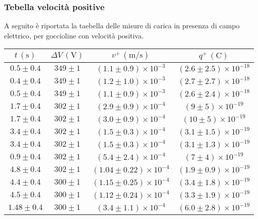 \subsubsection{Tebella velocità positive}
A seguito è riportata la taebella delle misure di carica in presenza di campo elettrico, per goccioline con velocità positiva.        \renewcommand{\arraystretch}{1.3} %
        \begin{longtable}[C]{|c|c|c|c|}
            \hline
            $t \, (\mathrm{s})$ & $\Delta V \, (\mathrm{V})$ & $v^+ \, (\mathrm{m/s})$ & $q^+ \, (\mathrm{C})$ \\
            \hline
            $0.5 \pm 0.4$ & $349 \pm 1$ & $(1.1 \pm 0.9) \times 10^{-3}$ & $(2.6 \pm 2.5) \times 10^{-18}$ \\
            \hline
            $0.4 \pm 0.4$ & $349 \pm 1$ & $(1.2 \pm 1.0) \times 10^{-3}$ & $(2.7 \pm 2.7) \times 10^{-18}$ \\
            \hline
            $0.5 \pm 0.4$ & $349 \pm 1$ & $(1.1 \pm 0.9) \times 10^{-3}$ & $(2.6 \pm 2.4) \times 10^{-18}$ \\
            \hline
            $1.7 \pm 0.4$ & $302 \pm 1$ & $(2.9 \pm 0.9) \times 10^{-4}$ & $(9 \pm 5) \times 10^{-19}$ \\
            \hline
            $1.7 \pm 0.4$ & $302 \pm 1$ & $(3.0 \pm 0.9) \times 10^{-4}$ & $(10 \pm 5) \times 10^{-19}$ \\
            \hline
            $3.4 \pm 0.4$ & $302 \pm 1$ & $(1.5 \pm 0.3) \times 10^{-4}$ & $(3.1 \pm 1.5) \times 10^{-19}$ \\
            \hline
            $3.4 \pm 0.4$ & $302 \pm 1$ & $(1.5 \pm 0.3) \times 10^{-4}$ & $(3.1 \pm 1.3) \times 10^{-19}$ \\
            \hline
            $0.9 \pm 0.4$ & $302 \pm 1$ & $(5.4 \pm 2.4) \times 10^{-4}$ & $(7 \pm 4) \times 10^{-19}$ \\
            \hline
            $4.8 \pm 0.4$ & $302 \pm 1$ & $(1.04 \pm 0.22) \times 10^{-4}$ & $(1.9 \pm 0.9) \times 10^{-19}$ \\
            \hline
            $4.4 \pm 0.4$ & $300 \pm 1$ & $(1.15 \pm 0.25) \times 10^{-4}$ & $(3.4 \pm 1.8) \times 10^{-19}$ \\
            \hline
            $4.5 \pm 0.4$ & $300 \pm 1$ & $(1.12 \pm 0.24) \times 10^{-4}$ & $(3.3 \pm 1.9) \times 10^{-19}$ \\
            \hline
            $1.48 \pm 0.4$ & $300 \pm 1$ & $(3.4 \pm 1.1) \times 10^{-4}$ & $(6.0 \pm 2.8) \times 10^{-19}$ \\

\end{longtable}
